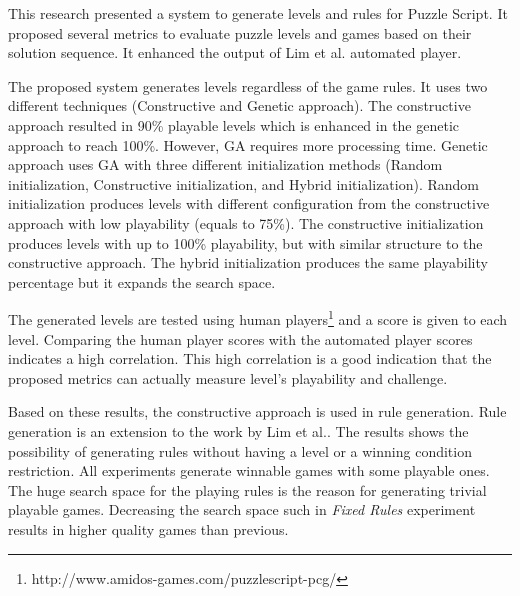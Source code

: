 This research presented a system to generate levels and rules for Puzzle Script. It proposed several metrics to evaluate puzzle levels and games based on their solution sequence. It enhanced the output of Lim et al. automated player\cite{puzzleScriptGeneration}.\\\par

The proposed system generates levels regardless of the game rules. It uses two different techniques (Constructive and Genetic approach). The constructive approach resulted in 90\% playable levels which is enhanced in the genetic approach to reach 100\%. However, GA requires more processing time. Genetic approach uses GA with three different initialization methods (Random initialization, Constructive initialization, and Hybrid initialization). Random initialization produces levels with different configuration from the constructive approach with low playability (equals to 75\%).  The constructive initialization produces levels with up to 100\% playability, but with similar structure to the constructive approach. The hybrid initialization produces the same playability percentage but it expands the search space.\\\par

The generated levels are tested using human players\footnote{http://www.amidos-games.com/puzzlescript-pcg/} and a score is given to each level. Comparing the human player scores with the automated player scores indicates a high correlation. This high correlation is a good indication that the proposed metrics can actually measure level's playability and challenge.\\\par

Based on these results, the constructive approach is used in rule generation. Rule generation is an extension to the work by Lim et al.\cite{puzzleScriptGeneration}. The results shows the possibility of generating rules without having a level or a winning condition restriction. All experiments generate winnable games with some playable ones. The huge search space for the playing rules is the reason for generating trivial playable games. Decreasing the search space such in \emph{Fixed Rules} experiment results in higher quality games than previous.\\\par

